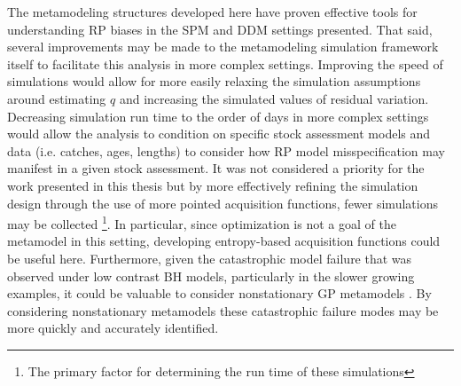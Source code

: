 \documentclass[12pt]{ucscthesis}
\begin{document}
%
The metamodeling structures developed here have proven effective tools for understanding RP biases 
in the SPM and DDM settings presented. That said, several improvements may be made to the metamodeling 
simulation framework itself to facilitate this analysis in more complex settings. Improving the speed 
of simulations would allow for more easily relaxing the simulation assumptions around estimating $q$ and 
increasing the simulated values of residual variation.
Decreasing simulation run time to the order of days in more complex settings would allow the analysis to
condition on specific stock assessment models and data (i.e. catches, ages, lengths) to consider how RP model 
misspecification may manifest in a given stock assessment. It was not considered a priority 
for the work presented in this thesis but by more effectively refining the simulation design through the 
use of more pointed acquisition functions\cite{pourmohamad_bayesian_2021}, fewer simulations may be collected 
\footnote{The primary factor for determining the run time of these simulations}. In particular, since 
optimization is not a goal of the metamodel in this setting, developing entropy-based acquisition functions 
\cite{hennig_entropy_2012, hernandez-lobato_predictive_2014} could be useful here. Furthermore, given the 
catastrophic model failure that was observed under low contrast BH models, particularly in the slower 
growing examples, it could be valuable to consider nonstationary GP metamodels \cite{gramacy_bayesian_2008, binois_hetgp_2021}. %
By considering nonstationary metamodels these catastrophic failure modes 
may be more quickly and accurately identified.


\end{document}
